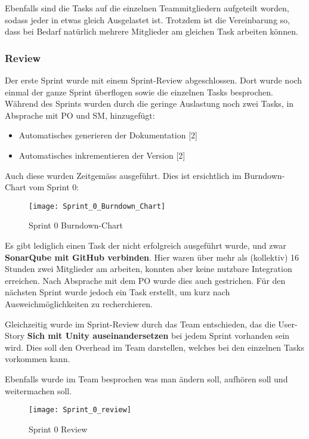 \documentclass[../main.tex]{subfiles}
\begin{document}
	\par Ebenfalls sind die Tasks auf die einzelnen Teammitgliedern aufgeteilt worden, sodass jeder in etwas gleich Ausgelastet ist. Trotzdem ist die Vereinbarung so, dass bei Bedarf natürlich mehrere Mitglieder am gleichen Task arbeiten können.


	\subsubsection{Review}
	\label{section:Review}
	\par Der erste Sprint wurde mit einem Sprint-Review abgeschlossen. Dort wurde noch einmal der ganze Sprint überflogen sowie die einzelnen Tasks besprochen. Während des Sprints wurden durch die geringe Auslastung noch zwei Tasks, in Absprache mit PO und SM, hinzugefügt:
	
	\begin{itemize}
		\item Automatisches generieren der Dokumentation [2]
		\item Automatisches inkrementieren der Version [2]
	\end{itemize}

	Auch diese wurden Zeitgemäss ausgeführt. Dies ist ersichtlich im Burndown-Chart vom Sprint 0:
	
	\begin{figure}[H]
		\centering
		\texttt{[image: Sprint\_0\_Burndown\_Chart]}
		\caption{Sprint 0 Burndown-Chart}
	\end{figure}

	\par Es gibt lediglich einen Task der nicht erfolgreich ausgeführt wurde, und zwar \textbf{SonarQube mit GitHub verbinden}. Hier waren über mehr als (kollektiv) 16 Stunden zwei Mitglieder am arbeiten, konnten aber keine nutzbare Integration erreichen. Nach Absprache mit dem PO wurde dies auch gestrichen. Für den nächsten Sprint wurde jedoch ein Task erstellt, um kurz nach Ausweichmöglichkeiten zu recherchieren.
	
	\par Gleichzeitig wurde im Sprint-Review durch das Team entschieden, das die User-Story \textbf{Sich mit Unity auseinandersetzen} bei jedem Sprint vorhanden sein wird. Dies soll den Overhead im Team darstellen, welches bei den einzelnen Tasks vorkommen kann.
	
	\par Ebenfalls wurde im Team besprochen was man ändern soll, aufhören soll und weitermachen soll.
	
	\begin{figure}[H]
		\centering
		\texttt{[image: Sprint\_0\_review]}
		\caption{Sprint 0 Review}
	\end{figure}
	
\end{document}
